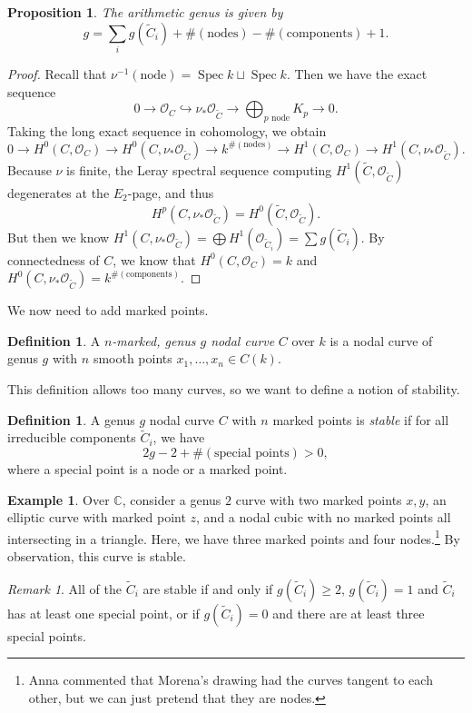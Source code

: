 \documentclass[leqno, openany]{memoir}
\newtheorem{prop}[thm]{Proposition}
\theoremstyle{definition}
\newtheorem{defn}[thm]{Definition}
\newtheorem{exm}[thm]{Example}
\theoremstyle{remark}
\newtheorem{rmk}[thm]{Remark}
\theoremstyle{plain}
\theoremstyle{definition}
\theoremstyle{remark}
\newcommand{\C}{\mathbb{C}}
\newcommand{\mc}[1]{\mathcal{#1}}
\newcommand{\wt}[1]{\widetilde{#1}}
\DeclareMathOperator{\Spec}{Spec}
\begin{document}
\begin{prop}
    The arithmetic genus is given by
    \[ g = \sum_i g(\wt{C}_i) + \#(\text{nodes}) - \#(\text{components}) + 1. \]
\end{prop}

\begin{proof}
    Recall that $\nu^{-1}(\text{node}) = \Spec k \sqcup \Spec k$. Then we have the exact sequence
    \[ 0 \to \mc{O}_C \hookrightarrow \nu_* \mc{O}_{\wt{C}} \to \bigoplus_{p \text{ node}} K_p \to 0. \]
    Taking the long exact sequence in cohomology, we obtain
    \[ 0 \to H^0(C, \mc{O}_C) \to H^0(C, \nu_* \mc{O}_{\wt{C}}) \to k^{\#(\text{nodes})} \to H^1(C, \mc{O}_C) \to H^1(C, \nu_* \mc{O}_{\wt{C}}). \]
    Because $\nu$ is finite, the Leray spectral sequence computing $H^1(\wt{C}, \mc{O}_{\wt{C}})$ degenerates at the $E_2$-page, and thus
    \[ H^p(C, \nu_* \mc{O}_{\wt{C}}) = H^0(\wt{C}, \mc{O}_{\wt{C}}). \]
    But then we know $H^1(C, \nu_* \mc{O}_{\wt{C}}) = \bigoplus H^1(\mc{O}_{\wt{C}_i}) = \sum g(\wt{C}_i)$. By connectedness of $C$, we know that $H^0(C, \mc{O}_C) = k$ and $H^0(C, \nu_* \mc{O}_{\wt{C}}) = k^{\#(\text{components})}$.
\end{proof}

We now need to add marked points.
\begin{defn}
    A \textit{$n$-marked, genus $g$ nodal curve} $C$ over $k$ is a nodal curve of genus $g$ with $n$ smooth points $x_1, \ldots, x_n \in C(k)$.
\end{defn}
This definition allows too many curves, so we want to define a notion of stability.
\begin{defn}
    A genus $g$ nodal curve $C$ with $n$ marked points is \textit{stable} if for all irreducible components $\wt{C}_i$, we have
    \[ 2g-2 + \#(\text{special points}) > 0, \]
    where a special point is a node or a marked point.
\end{defn}

\begin{exm}
    Over $\C$, consider a genus $2$ curve with two marked points $x,y$, an elliptic curve with marked point $z$, and a nodal cubic with no marked points all intersecting in a triangle. Here, we have three marked points and four nodes.\footnote{Anna commented that Morena's drawing had the curves tangent to each other, but we can just pretend that they are nodes.} By observation, this curve is stable.
\end{exm}

\begin{rmk}
    All of the $\wt{C}_i$ are stable if and only if $g(\wt{C}_i) \geq 2$, $g(\wt{C}_i) = 1$ and $\wt{C}_i$ has at least one special point, or if $g(\wt{C}_i) = 0$ and there are at least three special points.
\end{rmk}
\end{document}
